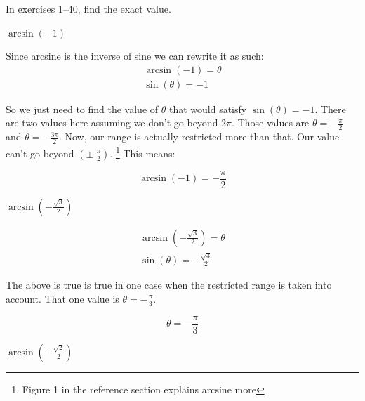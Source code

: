 \documentclass[10pt,letterpaper]{amspset}
\begin{document}

In exercises 1--40, find the exact value.

\begin{problem}[1]
    $\arcsin(-1)$
\end{problem}

\begin{solution}
    Since arcsine is the inverse of sine we can rewrite it as such:
    \begin{align}
        \arcsin(-1) = \theta \\
        \sin(\theta) = -1
    \end{align}
    
    So we just need to find the value of $\theta$ that would satisfy $\sin(\theta) = -1$. There are two values here assuming we don't go beyond $2\pi$. Those values are $\theta = -\frac{\pi}{2}$ and $\theta = -\frac{3\pi}{2}$. Now, our range is actually restricted more than that. Our value can't go beyond $(\pm\ \frac{\pi}{2})$. \footnote{Figure 1 in the reference section explains arcsine more} This means:
    
    \[\boxed{ \arcsin(-1) = -\frac{\pi}{2}  }\]
\end{solution}


\begin{problem}[2]
    $\arcsin(-\frac{ \sqrt{3} } {2})$
\end{problem}

\begin{solution}
    \begin{align}
        \arcsin(-\frac{ \sqrt{3} } {2}) = \theta \\
        \sin(\theta) = -\frac{ \sqrt{3} } {2}
    \end{align}
    
    The above is true is true in one case when the restricted range is taken into account. That one value is $ \theta = -\frac{\pi}{3}$.
    
    \[\boxed{ \theta = -\frac{\pi}{3} }\]
\end{solution}


\pagebreak


\begin{problem}[3]
    $\arcsin(-\frac{ \sqrt{2} } {2})$
\end{problem}
\end{document}
